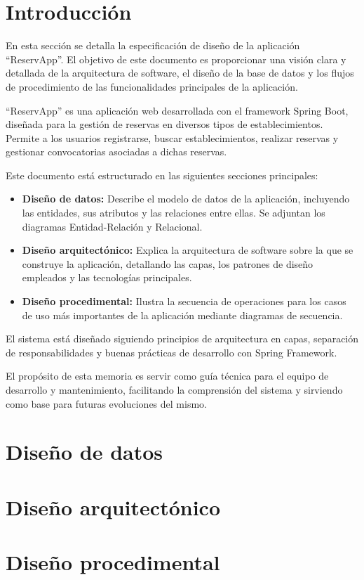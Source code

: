 
\section{Introducción}

En esta sección se detalla la especificación de diseño de la aplicación ``ReservApp''. El objetivo de este documento es proporcionar una visión clara y detallada de la arquitectura de software, el diseño de la base de datos y los flujos de procedimiento de las funcionalidades principales de la aplicación.

``ReservApp'' es una aplicación web desarrollada con el framework Spring Boot, diseñada para la gestión de reservas en diversos tipos de establecimientos. Permite a los usuarios registrarse, buscar establecimientos, realizar reservas y gestionar convocatorias asociadas a dichas reservas.

Este documento está estructurado en las siguientes secciones principales:
\begin{itemize}
    \item \textbf{Diseño de datos:} Describe el modelo de datos de la aplicación, incluyendo las entidades, sus atributos y las relaciones entre ellas. Se adjuntan los diagramas Entidad-Relación y Relacional.
    \item \textbf{Diseño arquitectónico:} Explica la arquitectura de software sobre la que se construye la aplicación, detallando las capas, los patrones de diseño empleados y las tecnologías principales.
    \item \textbf{Diseño procedimental:} Ilustra la secuencia de operaciones para los casos de uso más importantes de la aplicación mediante diagramas de secuencia.
\end{itemize}

El sistema está diseñado siguiendo principios de arquitectura en capas, separación de responsabilidades y buenas prácticas de desarrollo con Spring Framework.

El propósito de esta memoria es servir como guía técnica para el equipo de desarrollo y mantenimiento, facilitando la comprensión del sistema y sirviendo como base para futuras evoluciones del mismo.

\section{Diseño de datos}


\section{Diseño arquitectónico}

\section{Diseño procedimental}



